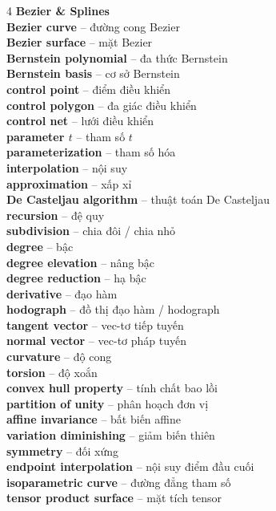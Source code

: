 \begin{multicols}{4}
\textbf{Bezier \& Splines}\\
\textbf{Bezier curve} -- đường cong Bezier\\
\textbf{Bezier surface} -- mặt Bezier\\
\textbf{Bernstein polynomial} -- đa thức Bernstein\\
\textbf{Bernstein basis} -- cơ sở Bernstein\\
\textbf{control point} -- điểm điều khiển\\
\textbf{control polygon} -- đa giác điều khiển\\
\textbf{control net} -- lưới điều khiển\\
\textbf{parameter $t$} -- tham số $t$\\
\textbf{parameterization} -- tham số hóa\\
\textbf{interpolation} -- nội suy\\
\textbf{approximation} -- xấp xỉ\\
\textbf{De Casteljau algorithm} -- thuật toán De Casteljau\\
\textbf{recursion} -- đệ quy\\
\textbf{subdivision} -- chia đôi / chia nhỏ\\
\textbf{degree} -- bậc\\
\textbf{degree elevation} -- nâng bậc\\
\textbf{degree reduction} -- hạ bậc\\
\textbf{derivative} -- đạo hàm\\
\textbf{hodograph} -- đồ thị đạo hàm / hodograph\\
\textbf{tangent vector} -- vec-tơ tiếp tuyến\\
\textbf{normal vector} -- vec-tơ pháp tuyến\\
\textbf{curvature} -- độ cong\\
\textbf{torsion} -- độ xoắn\\
\textbf{convex hull property} -- tính chất bao lồi\\
\textbf{partition of unity} -- phân hoạch đơn vị\\
\textbf{affine invariance} -- bất biến affine\\
\textbf{variation diminishing} -- giảm biến thiên\\
\textbf{symmetry} -- đối xứng\\
\textbf{endpoint interpolation} -- nội suy điểm đầu cuối\\
\textbf{isoparametric curve} -- đường đẳng tham số\\
\textbf{tensor product surface} -- mặt tích tensor\\

\end{multicols}
